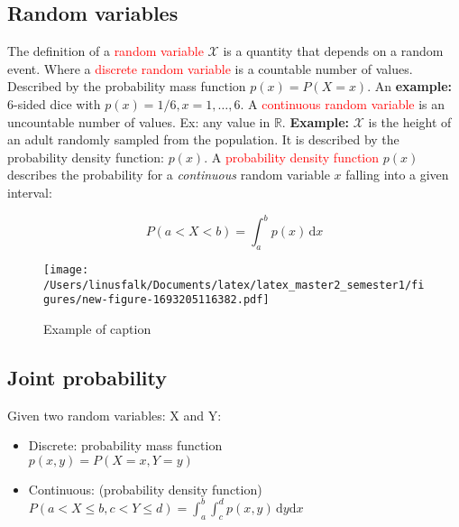 
\subsection{Random variables}
The definition of a \textcolor{red}{random variable} $\mathcal{X}$ is a quantity that depends on a random event. Where a
\textcolor{red}{discrete random variable} is a countable number of values. Described by the probability mass function 
$p(x) = P(X=x)$. An \textbf{example:} 6-sided dice with $p(x) = 1/6, x=1, \dots, 6$.
A \textcolor{red}{continuous random variable} is an uncountable number of values. Ex: any value in $\mathbb{R}$. \textbf{Example:} $\mathcal{X}$ is the height of an adult randomly sampled from the population.
It is described by the probability density function: $p(x)$.
\newline
A \textcolor{red}{probability density function} $p(x)$ describes the probability for a \emph{continuous} random variable $x$ falling into a given interval:

\begin{equation}
    P(a < X < b) = \int_{a}^{b} p(x)\,\text{d}x
\end{equation}

\begin{figure}[ht!]
\centering
\texttt{[image: /Users/linusfalk/Documents/latex/latex\_master2\_semester1/figures/new-figure-1693205116382.pdf]}
\caption{Example of caption}
\label{fig:example}
\end{figure}

\subsection{Joint probability}
Given two random variables: X and Y:

\begin{itemize}
    \item Discrete: probability mass function \\ 
    $p(x,y) = P(X=x, Y = y)$
    \item Continuous: (probability density function) \\
    $P(a < X \le b, c < Y \le d) = \int_{a}^{b}\int_{c}^{d} p(x,y) \,\text{d}y \text{d}x$
\end{itemize}



